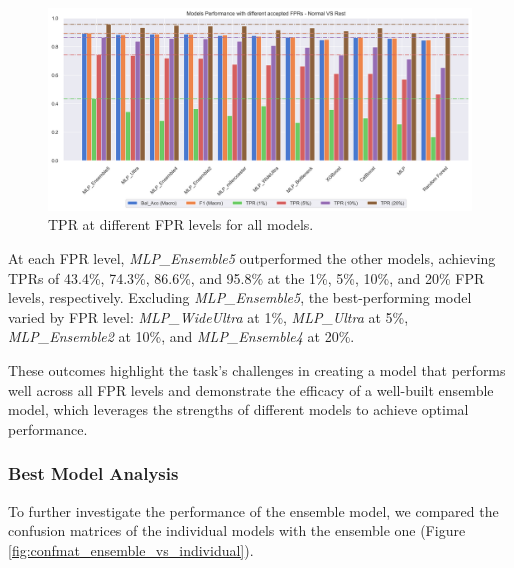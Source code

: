 \begin{figure}[htpb]
    \centering
    \includegraphics[width=1\textwidth]{./images/nomrVSrest_all.png}
    \caption{TPR at different FPR levels for all models.}
    \label{fig:normVSrest_all}
\end{figure}

At each FPR level, \textit{MLP\_Ensemble5} outperformed the other models, 
achieving TPRs of 43.4\%, 74.3\%, 86.6\%, and 95.8\% at the 1\%, 5\%, 10\%, and 20\% FPR levels, 
respectively. Excluding \textit{MLP\_Ensemble5}, the best-performing model varied by 
FPR level: \textit{MLP\_WideUltra} at 1\%, \textit{MLP\_Ultra} at 5\%, \textit{MLP\_Ensemble2} at 10\%, 
and \textit{MLP\_Ensemble4} at 20\%.

These outcomes highlight the task's challenges in creating a model that performs well across all FPR 
levels and demonstrate the efficacy of a well-built ensemble model, which leverages the strengths of 
different models to achieve optimal performance.

\subsubsection{Best Model Analysis}

To further investigate the performance of the ensemble model, we compared the confusion matrices of
the individual models with the ensemble one (Figure \ref{fig:confmat_ensemble_vs_individual}).

